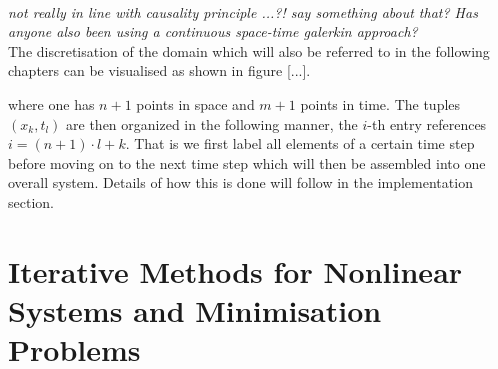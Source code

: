 \documentclass[../draft_1.tex]{subfiles}
\begin{document}
\smallskip
\\
\textit{not really in line with causality principle ...?! say something about that? Has anyone also been using a continuous space-time galerkin approach?}
\smallskip
\\
The discretisation of the domain which will also be referred to in the following chapters can be visualised as shown in figure [...].
\begin{figure}[ht!]
	\centering
	
	
\end{figure}

where one has $n+1$ points in space and $m+1$ points in time. The tuples $(x_k, t_l)$ are then organized in the following manner, the $i$-th entry references $i = (n+1) \cdot l + k$. That is we first label all elements of a certain time step before moving on to the next time step which will then be assembled into one overall system. Details of how this is done will follow in the implementation section. %

\section{Iterative Methods for Nonlinear Systems and Minimisation Problems}
\end{document}
